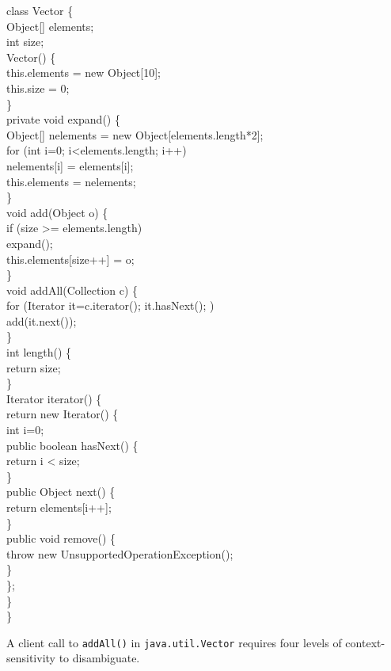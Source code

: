 \documentclass[11pt,notitlepage]{article}
\begin{document}
\begin{myfigure}\small
\begin{samplecode}
class Vector \{\\
\>Object[] elements;\\
\>int size;\\
\>Vector() \{\\
\>\>this.elements = new Object[10];\\
\>\>this.size = 0;\\
\>\}\\
\>private void expand() \{\\
\>\>Object[] nelements = new Object[elements.length*2];\\
\>\>for (int i=0; i<elements.length; i++)\\
\>\>\>nelements[i] = elements[i];\\
\>\>this.elements = nelements;\\
\>\}\\
\>void add(Object o) \{\\
\>\>if (size >= elements.length)\\
\>\>\>expand();\\
\>\>this.elements[size++] = o;\\
\>\}\\
\>void addAll(Collection c) \{\\
\>\>for (Iterator it=c.iterator(); it.hasNext(); )\\
\>\>\>add(it.next());\\
\>\}\\
\>int length() \{\\
\>\>return size;\\
\>\}\\
\>Iterator iterator() \{\\
\>\>return new Iterator() \{\\
\>\>\>int i=0;\\
\>\>\>public boolean hasNext() \{\\
\>\>\>\>return i < size;\\
\>\>\>\}\\
\>\>\>public Object next() \{\\
\>\>\>\>return elements[i++];\\
\>\>\>\}\\
\>\>\>public void remove() \{\\
\>\>\>\>throw new UnsupportedOperationException();\\
\>\>\>\}\\
\>\>\};\\
\>\}\\
\}\\
\end{samplecode}
\caption{A client call to \texttt{addAll()} in \texttt{java.util.Vector}
  requires four levels of context-sensitivity to disambiguate.}
\label{fig:vector}
\end{myfigure}
\end{document}
